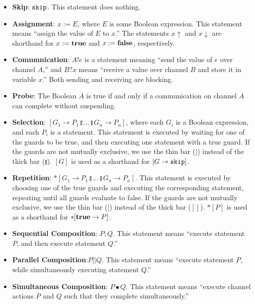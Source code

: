 \documentclass[times, 10pt]{article}
\def\Skip{\hbox{\tt skip}}
\def\true{\hbox{\bf true}}
\def\false{\hbox{\bf false}}
\begin{document}
\begin{itemize}

\item \textbf{Skip}: $\Skip$.  This statement does nothing.

\item \textbf{Assignment}: $x := E$, where $E$ is some Boolean expression.  This
statement means ``assign the value of $E$ to $x$.'' The statements $x\uparrow$
and $x\downarrow$ are shorthand for $x := \true$ and $x := \false$,
respectively.

\item \textbf{Communication}: $A!e$ is a statement meaning ``send the value of
$e$ over channel $A$,'' and $B?x$ means ``receive a value over channel $B$ and
store it in variable $x$.''  Both sending and receiving are blocking.

\item \textbf{Probe}: The Boolean $\overline{A}$ is true if and only if a
communication on channel $A$ can complete without suspending.

\item \textbf{Selection}: $[G_1 \rightarrow P_1 \talloblong ... \talloblong G_n
\rightarrow P_n]$, where each $G_i$ is a Boolean expression, and each $P_i$ is a
statement.  This statement is executed by waiting for one of the guards to be
true, and then executing one statement with a true guard.  If the guards are not
mutually exclusive, we use the thin bar ($|$) instead of the thick bar
($\talloblong$). $[G]$ is used as a shorthand for $[G \rightarrow \Skip]$.

\item \textbf{Repetition}: $*[G_1 \rightarrow P_1 \talloblong ... \talloblong
G_n \rightarrow P_n]$. This statement is executed by choosing one of the true
guards and executing the corresponding statement, repeating until all guards
evaluate to false. If the guards are not mutually exclusive, we use the thin bar
($|$) instead of the thick bar ($[]$). $*[P]$ is used as a shorthand for
$*[\true \rightarrow P]$.

\item \textbf{Sequential Composition}: $P;Q$.  This statement means ``execute
statement $P$, and then execute statement $Q$.''

\item \textbf{Parallel Composition}:$P || Q$.  This statement means ``execute
statement $P$, while simultaneously executing statement $Q$.''

\item \textbf{Simultaneous Composition}: $P \bullet Q$.  This statement means
``execute channel actions $P$ and $Q$ such that they complete
simultaneously.'' 

\end{itemize}
\end{document}
